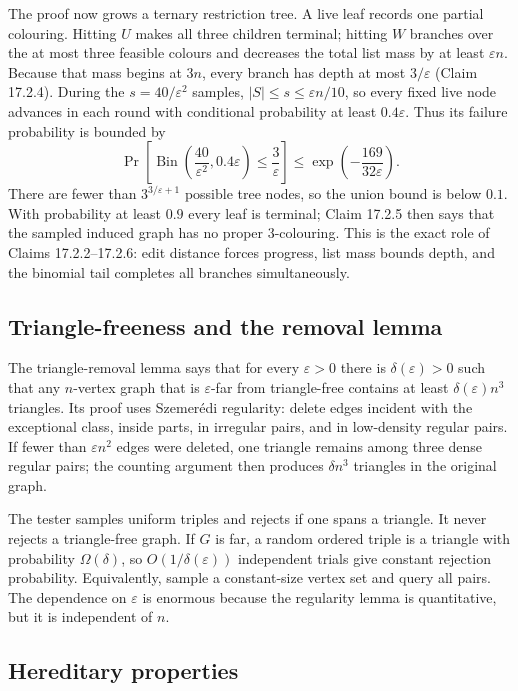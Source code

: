 \documentclass[10pt]{article}
\newcommand{\1}{\mathbf 1}
\begin{document}
The proof now grows a ternary restriction tree.  A live leaf records one
partial colouring.  Hitting $U$ makes all three children terminal; hitting
$W$ branches over the at most three feasible colours and decreases the total
list mass by at least $\varepsilon n$.  Because that mass begins at $3n$,
every branch has depth at most $3/\varepsilon$ (Claim 17.2.4).  During the
$s=40/\varepsilon^2$ samples, $|S|\leq s\leq\varepsilon n/10$, so every fixed
live node advances in each round with conditional probability at least
$0.4\varepsilon$.  Thus its failure probability is bounded by
\[
 \Pr\!\left[\operatorname{Bin}
   \left(\frac{40}{\varepsilon^2},0.4\varepsilon\right)
   \leq\frac3\varepsilon\right]
 \leq \exp\!\left(-\frac{169}{32\varepsilon}\right).
\]
There are fewer than $3^{3/\varepsilon+1}$ possible tree nodes, so the union
bound is below $0.1$.  With probability at least $0.9$ every leaf is terminal;
Claim 17.2.5 then says that the sampled induced graph has no proper
3-colouring.  This is the exact role of Claims 17.2.2--17.2.6: edit distance
forces progress, list mass bounds depth, and the binomial tail completes all
branches simultaneously.

\subsection{Triangle-freeness and the removal lemma}

The triangle-removal lemma says that for every $\varepsilon>0$ there is
$\delta(\varepsilon)>0$ such that any $n$-vertex graph that is
$\varepsilon$-far from triangle-free contains at least
$\delta(\varepsilon)n^3$ triangles.  Its proof uses Szemerédi regularity:
delete edges incident with the exceptional class, inside parts, in irregular
pairs, and in low-density regular pairs.  If fewer than $\varepsilon n^2$
edges were deleted, one triangle remains among three dense regular pairs; the
counting argument then produces $\delta n^3$ triangles in the original graph.

The tester samples uniform triples and rejects if one spans a triangle.
It never rejects a triangle-free graph.  If $G$ is far, a random ordered triple
is a triangle with probability $\Omega(\delta)$, so
$O(1/\delta(\varepsilon))$ independent trials give constant rejection
probability.  Equivalently, sample a constant-size vertex set and query all
pairs.  The dependence on $\varepsilon$ is enormous because the regularity
lemma is quantitative, but it is independent of $n$.

\subsection{Hereditary properties}
\end{document}
